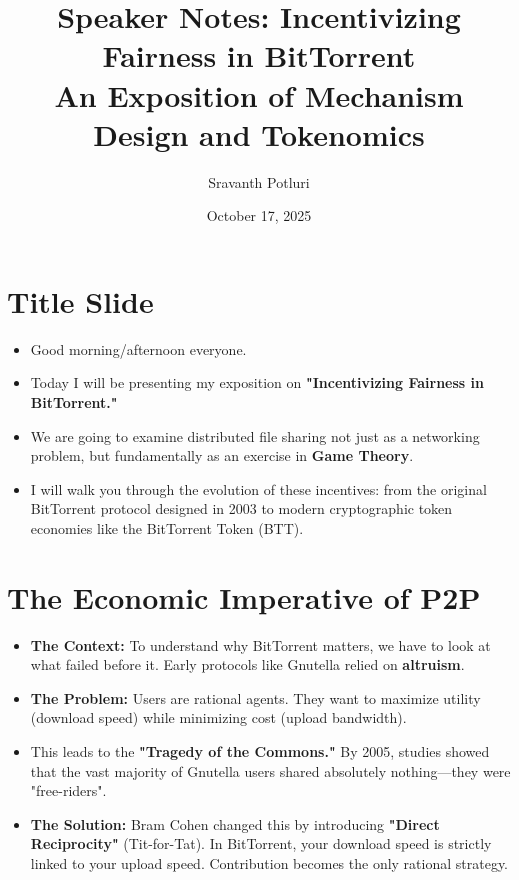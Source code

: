 \documentclass[11pt, letterpaper]{article}
\title{\textbf{Speaker Notes: Incentivizing Fairness in BitTorrent}\\
\large An Exposition of Mechanism Design and Tokenomics}
\author{Sravanth Potluri}
\date{October 17, 2025}
\begin{document}
\maketitle

\section{Title Slide}
\begin{itemize}
    \item Good morning/afternoon everyone.
    \item Today I will be presenting my exposition on \textbf{"Incentivizing Fairness in BitTorrent."}
    \item We are going to examine distributed file sharing not just as a networking problem, but fundamentally as an exercise in \textbf{Game Theory}.
    \item I will walk you through the evolution of these incentives: from the original BitTorrent protocol designed in 2003 to modern cryptographic token economies like the BitTorrent Token (BTT).
\end{itemize}

\section{The Economic Imperative of P2P}
\begin{itemize}
    \item \textbf{The Context:} To understand why BitTorrent matters, we have to look at what failed before it. Early protocols like Gnutella relied on \textbf{altruism}.
    \item \textbf{The Problem:} Users are rational agents. They want to maximize utility (download speed) while minimizing cost (upload bandwidth).
    \item This leads to the \textbf{"Tragedy of the Commons."} By 2005, studies showed that the vast majority of Gnutella users shared absolutely nothing—they were "free-riders".
    \item \textbf{The Solution:} Bram Cohen changed this by introducing \textbf{"Direct Reciprocity"} (Tit-for-Tat). In BitTorrent, your download speed is strictly linked to your upload speed. Contribution becomes the only rational strategy.
\end{itemize}
\end{document}
